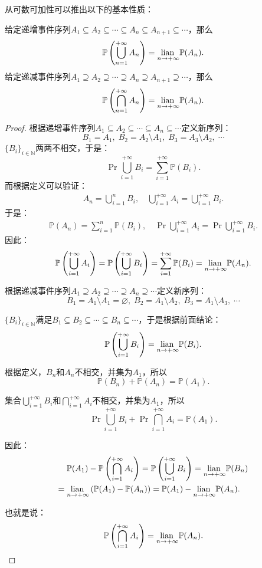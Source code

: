 \documentclass[12pt,UTF8]{ctexbook}
\begin{document}
从可数可加性可以推出以下的基本性质：
\begin{tm}
    给定递增事件序列$A_1\subseteq A_2\subseteq \cdots \subseteq A_n \subseteq A_{n+1} \subseteq \cdots$，那么
    $$ \mathbb{P}\left(\bigcup_{n=1}^{+\infty} A_n\right) = \underset{n\to+\infty}{\operatorname{lian}\,} \mathbb{P}(A_n). $$
    给定递减事件序列$A_1\supseteq A_2\supseteq \cdots \supseteq A_n \supseteq A_{n+1} \supseteq \cdots$，那么
    $$ \mathbb{P}\left(\bigcap_{n=1}^{+\infty} A_n\right) = \underset{n\to+\infty}{\operatorname{lian}\,} \mathbb{P}(A_n). $$
\end{tm}

\begin{proof}
    根据递增事件序列$A_1\subseteq A_2\subseteq \cdots \subseteq A_n \subseteq \cdots$定义新序列：
    $$ B_1 = A_1, \; B_2 = A_2\setminus A_1, \; B_3 = A_3\setminus A_2, \; \cdots$$
    $\{B_i\}_{i\in\mathbb{N}}$两两不相交，于是：
    $$ \Pr{\bigcup_{i=1}^{+\infty} B_i} = \sum_{i=1}^{+\infty} \mathbb{P}(B_i). $$
    而根据定义可以验证：
    \begin{align*}
        A_n = \bigcup_{i=1}^{n} B_i ,\quad \bigcup_{i=1}^{+\infty} A_i = \bigcup_{i=1}^{+\infty} B_i .
    \end{align*}
    于是：
    \begin{align*}
        \mathbb{P}(A_n) = \sum_{i=1}^{n} \mathbb{P}(B_i) , \quad
        \Pr{\bigcup_{i=1}^{+\infty} A_i} = \Pr{\bigcup_{i=1}^{+\infty} B_i} .
    \end{align*}
    因此：
    $$ \mathbb{P}\left(\bigcup_{i=1}^{+\infty} A_i\right) = \mathbb{P}\left(\bigcup_{i=1}^{+\infty} B_i\right) = \sum_{i=1}^{+\infty} \mathbb{P}(B_i) = \underset{n\to+\infty}{\operatorname{lian}\,} \mathbb{P}(A_n). $$

    根据递减事件序列$A_1\supseteq A_2\supseteq \cdots \supseteq A_n \supseteq \cdots$定义新序列：
    $$ B_1 = A_1\setminus A_1 = \varnothing, \; B_2 = A_1\setminus A_2, \; B_3 = A_1\setminus A_3, \; \cdots$$

    $\{B_i\}_{i\in\mathbb{N}}$满足$B_1\subseteq B_2\subseteq \cdots \subseteq B_n \subseteq \cdots$，于是根据前面结论：
    $$ \mathbb{P}\left(\bigcup_{i=1}^{+\infty} B_i\right) = \underset{n\to+\infty}{\operatorname{lian}\,}  \mathbb{P}(B_i). $$

    根据定义，$B_n$和$A_n$不相交，并集为$A_1$，所以
    $$ \mathbb{P}(B_n) + \mathbb{P}(A_n) = \mathbb{P}(A_1). $$

    集合$\bigcup_{i=1}^{+\infty} B_i$和$\bigcap_{i=1}^{+\infty} A_i$不相交，并集为$A_1$，所以
    $$ \Pr{\bigcup_{i=1}^{+\infty} B_i} + \Pr{\bigcap_{i=1}^{+\infty} A_i} = \mathbb{P}(A_1). $$

    因此：
    \begin{align*}
        &\mathbb{P}(A_1) - \mathbb{P}\left(\bigcap_{i=1}^{+\infty} A_i\right) = \mathbb{P}\left(\bigcup_{i=1}^{+\infty} B_i\right) = \underset{n\to+\infty}{\operatorname{lian}\,}  \mathbb{P}(B_n) \\
        =\;& \underset{n\to+\infty}{\operatorname{lian}\,} \left( \mathbb{P}(A_1) - \mathbb{P}(A_n) \right) = \mathbb{P}(A_1) - \underset{n\to+\infty}{\operatorname{lian}\,} \mathbb{P}(A_n).
    \end{align*}
    
    也就是说：
    $$ \mathbb{P}\left(\bigcap_{i=1}^{+\infty} A_i\right) = \underset{n\to+\infty}{\operatorname{lian}\,} \mathbb{P}(A_n). $$
\end{proof}
\end{document}
